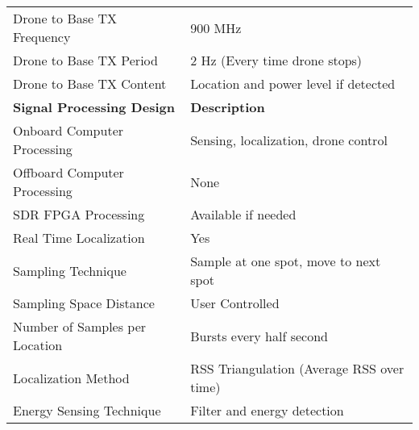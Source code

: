 \begin{table}[ht]
\begin{tabular}{|l|l|}
            Drone to Base TX Frequency            & 900 MHz                                   \\
            Drone to Base TX Period               & 2 Hz (Every time drone stops)             \\
            Drone to Base TX Content              & Location and power level if detected      \\
    \hline  \textbf{Signal Processing Design}     & \textbf{Description}                      \\ \hline
            Onboard Computer Processing           & Sensing, localization, drone control      \\
            Offboard Computer Processing          & None                                      \\
            SDR FPGA Processing                   & Available if needed                       \\
            Real Time Localization                & Yes                                       \\
            Sampling Technique                    & Sample at one spot, move to next spot     \\
            Sampling Space Distance               & User Controlled                           \\
            Number of Samples per Location        & Bursts every half second                  \\
            Localization Method                   & RSS Triangulation (Average RSS over time) \\
            Energy Sensing Technique              & Filter and energy detection               \\ \hline
\end{tabular}
\end{table}\par
